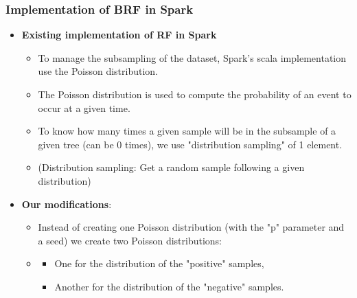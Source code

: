 \documentclass[slidestop,compress,red,mathserif]{beamer}
\begin{document}
\begin{frame}
\frametitle{Implementation of BRF in Spark}
\begin{itemize}
  \item[] \textbf{Existing implementation of RF in Spark}
    \begin{itemize}
    	\item To manage the subsampling of the dataset, Spark's scala implementation use the Poisson distribution.
      \item The Poisson distribution is used to compute the probability of an event to occur at a given time.
    	\item To know how many times a given sample will be in the subsample of a given tree (can be 0 times), we use "distribution sampling" of 1 element.
      \item (Distribution sampling: Get a random sample following a given distribution)
    \end{itemize}
  \item[] \textbf{Our modifications}:
    \begin{itemize}
      \item Instead of creating one Poisson distribution (with the "p" parameter and a seed) we create two Poisson distributions:
    	\item[]
      \begin{itemize}
      	\item One for the distribution of the "positive" samples,
        \item Another for the distribution of the "negative" samples.
      \end{itemize}
    \end{itemize}
\end{itemize}
\end{frame}
\end{document}
